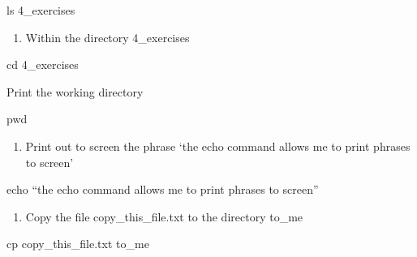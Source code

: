 \documentclass[
  letterpaper,
  DIV=11,
  numbers=noendperiod]{scrreprt}
\newenvironment{Shaded}{\begin{snugshade}}{\end{snugshade}}
\newcommand{\BuiltInTok}[1]{\textcolor[rgb]{0.00,0.23,0.31}{#1}}
\newcommand{\FunctionTok}[1]{\textcolor[rgb]{0.28,0.35,0.67}{#1}}
\newcommand{\NormalTok}[1]{\textcolor[rgb]{0.00,0.23,0.31}{#1}}
\providecommand{\tightlist}{%
  \setlength{\itemsep}{0pt}\setlength{\parskip}{0pt}}
\begin{document}
\begin{Shaded}
\begin{Highlighting}[]
\FunctionTok{ls}\NormalTok{ 4\_exercises}
\end{Highlighting}
\end{Shaded}

\begin{enumerate}
\def\labelenumi{\arabic{enumi}.}
\setcounter{enumi}{3}
\tightlist
\item
  Within the directory 4\_exercises
\end{enumerate}

\begin{Shaded}
\begin{Highlighting}[]
\BuiltInTok{cd}\NormalTok{ 4\_exercises}
\end{Highlighting}
\end{Shaded}

Print the working directory

\begin{Shaded}
\begin{Highlighting}[]
\BuiltInTok{pwd}
\end{Highlighting}
\end{Shaded}

\begin{enumerate}
\def\labelenumi{\alph{enumi}.}
\setcounter{enumi}{1}
\tightlist
\item
  Print out to screen the phrase `the echo command allows me to print
  phrases to screen'
\end{enumerate}

\begin{Shaded}
\begin{Highlighting}[]
\BuiltInTok{echo}\NormalTok{ “the echo command allows me to print phrases to screen”}
\end{Highlighting}
\end{Shaded}

\begin{enumerate}
\def\labelenumi{\alph{enumi}.}
\setcounter{enumi}{2}
\tightlist
\item
  Copy the file copy\_this\_file.txt to the directory to\_me
\end{enumerate}

\begin{Shaded}
\begin{Highlighting}[]
\FunctionTok{cp}\NormalTok{ copy\_this\_file.txt to\_me}
\end{Highlighting}
\end{Shaded}
\end{document}
